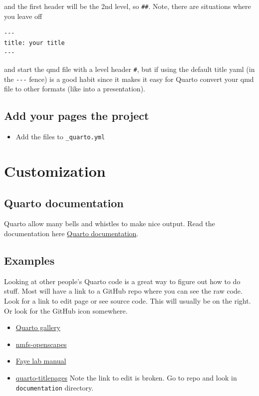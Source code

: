 \documentclass[
  letterpaper,
  oneside,
  open=any]{scrbook}
\providecommand{\tightlist}{%
  \setlength{\itemsep}{0pt}\setlength{\parskip}{0pt}}\usepackage{longtable,booktabs,array}
\begin{document}
and the first header will be the 2nd level, so \texttt{\#\#}. Note,
there are situations where you leave off

\begin{verbatim}
---
title: your title
---
\end{verbatim}

and start the qmd file with a level header \texttt{\#}, but if using the
default title yaml (in the \texttt{-\/-\/-} fence) is a good habit since
it makes it easy for Quarto convert your qmd file to other formats (like
into a presentation).

\section{Add your pages the project}\label{add-your-pages-the-project}

\begin{itemize}
\tightlist
\item
  Add the files to \texttt{\_quarto.yml}
\end{itemize}


\chapter{Customization}\label{customization}

\section{Quarto documentation}\label{quarto-documentation}

Quarto allow many bells and whistles to make nice output. Read the
documentation here \href{https://quarto.org/docs/guide/}{Quarto
documentation}.

\section{Examples}\label{examples}

Looking at other people's Quarto code is a great way to figure out how
to do stuff. Most will have a link to a GitHub repo where you can see
the raw code. Look for a link to edit page or see source code. This will
usually be on the right. Or look for the GitHub icon somewhere.

\begin{itemize}
\tightlist
\item
  \href{https://quarto.org/docs/gallery/}{Quarto gallery}
\item
  \href{https://nmfs-openscapes.github.io/}{nmfs-openscapes}
\item
  \href{https://thefaylab.github.io/lab-manual/}{Faye lab manual}
\item
  \href{https://nmfs-opensci.github.io/quarto_titlepages/}{quarto-titlepages}
  Note the link to edit is broken. Go to repo and look in
  \texttt{documentation} directory.
\end{itemize}
\end{document}
